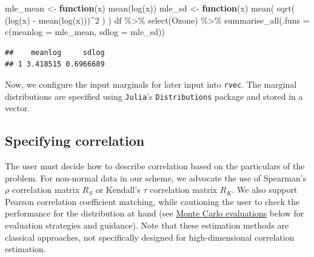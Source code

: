 \documentclass{article}
\newenvironment{Shaded}{\begin{snugshade}}{\end{snugshade}}
\newcommand{\AttributeTok}[1]{\textcolor[rgb]{0.77,0.63,0.00}{#1}}
\newcommand{\ControlFlowTok}[1]{\textcolor[rgb]{0.13,0.29,0.53}{\textbf{#1}}}
\newcommand{\DecValTok}[1]{\textcolor[rgb]{0.00,0.00,0.81}{#1}}
\newcommand{\FunctionTok}[1]{\textcolor[rgb]{0.00,0.00,0.00}{#1}}
\newcommand{\NormalTok}[1]{#1}
\newcommand{\OtherTok}[1]{\textcolor[rgb]{0.56,0.35,0.01}{#1}}
\newcommand{\SpecialCharTok}[1]{\textcolor[rgb]{0.00,0.00,0.00}{#1}}
\begin{document}
\begin{Shaded}
\begin{Highlighting}[]
\NormalTok{mle\_mean }\OtherTok{\textless{}{-}} \ControlFlowTok{function}\NormalTok{(x) }\FunctionTok{mean}\NormalTok{(}\FunctionTok{log}\NormalTok{(x))}
\NormalTok{mle\_sd }\OtherTok{\textless{}{-}} \ControlFlowTok{function}\NormalTok{(x) }\FunctionTok{mean}\NormalTok{( }\FunctionTok{sqrt}\NormalTok{( (}\FunctionTok{log}\NormalTok{(x) }\SpecialCharTok{{-}} \FunctionTok{mean}\NormalTok{(}\FunctionTok{log}\NormalTok{(x)))}\SpecialCharTok{\^{}}\DecValTok{2}\NormalTok{ ) )}
\NormalTok{df }\SpecialCharTok{\%\textgreater{}\%} 
  \FunctionTok{select}\NormalTok{(Ozone) }\SpecialCharTok{\%\textgreater{}\%} 
  \FunctionTok{summarise\_all}\NormalTok{(}\AttributeTok{.funs =} \FunctionTok{c}\NormalTok{(}\AttributeTok{meanlog =}\NormalTok{ mle\_mean, }\AttributeTok{sdlog =}\NormalTok{ mle\_sd))}
\end{Highlighting}
\end{Shaded}

\begin{verbatim}
##    meanlog     sdlog
## 1 3.418515 0.6966689
\end{verbatim}

Now, we configure the input marginals for later input into
\texttt{rvec}. The marginal distributions are specified using
\texttt{Julia}'s \texttt{Distributions} package and stored in a vector.

\begin{Shaded}
\end{Shaded}

\hypertarget{specifying-correlation}{%
\subsection{Specifying correlation}\label{specifying-correlation}}

The user must decide how to describe correlation based on the
particulars of the problem. For non-normal data in our scheme, we
advocate the use of Spearman's \(\rho\) correlation matrix \(R_S\) or
Kendall's \(\tau\) correlation matrix \(R_K\). We also support Pearson
correlation coefficient matching, while cautioning the user to check the
performance for the distribution at hand (see
\protect\hyperlink{simulations}{Monte Carlo evaluations} below for
evaluation strategies and guidance). Note that these estimation methods
are classical approaches, not specifically designed for high-dimensional
correlation estimation.
\end{document}
